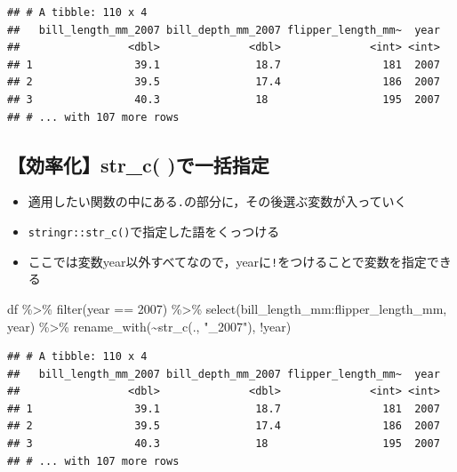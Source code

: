 \documentclass[
  xelatex,ja=standard, b5paper]{bxjsbook}
\newenvironment{Shaded}{\begin{snugshade}}{\end{snugshade}}
\newcommand{\DecValTok}[1]{\textcolor[rgb]{0.00,0.00,0.81}{#1}}
\newcommand{\FunctionTok}[1]{\textcolor[rgb]{0.00,0.00,0.00}{#1}}
\newcommand{\NormalTok}[1]{#1}
\newcommand{\SpecialCharTok}[1]{\textcolor[rgb]{0.00,0.00,0.00}{#1}}
\newcommand{\StringTok}[1]{\textcolor[rgb]{0.31,0.60,0.02}{#1}}
\providecommand{\tightlist}{%
  \setlength{\itemsep}{0pt}\setlength{\parskip}{0pt}}
\begin{document}
\begin{verbatim}
## # A tibble: 110 x 4
##   bill_length_mm_2007 bill_depth_mm_2007 flipper_length_mm~  year
##                 <dbl>              <dbl>              <int> <int>
## 1                39.1               18.7                181  2007
## 2                39.5               17.4                186  2007
## 3                40.3               18                  195  2007
## # ... with 107 more rows
\end{verbatim}

\hypertarget{rename-strc}{%
\subsection{【効率化】str\_c( )で一括指定}\label{rename-strc}}

\begin{itemize}
\tightlist
\item
  適用したい関数の中にある\texttt{.}の部分に，その後選ぶ変数が入っていく
\item
  \texttt{stringr::str\_c()}で指定した語をくっつける
\item
  ここでは変数year以外すべてなので，yearに\texttt{!}をつけることで変数を指定できる
\end{itemize}

\begin{Shaded}
\begin{Highlighting}[]
\NormalTok{df }\SpecialCharTok{\%\textgreater{}\%} 
  \FunctionTok{filter}\NormalTok{(year }\SpecialCharTok{==} \DecValTok{2007}\NormalTok{) }\SpecialCharTok{\%\textgreater{}\%} 
  \FunctionTok{select}\NormalTok{(bill\_length\_mm}\SpecialCharTok{:}\NormalTok{flipper\_length\_mm, year) }\SpecialCharTok{\%\textgreater{}\%} 
  \FunctionTok{rename\_with}\NormalTok{(}\SpecialCharTok{\textasciitilde{}}\FunctionTok{str\_c}\NormalTok{(., }\StringTok{"\_2007"}\NormalTok{),}
               \SpecialCharTok{!}\NormalTok{year)}
\end{Highlighting}
\end{Shaded}

\begin{verbatim}
## # A tibble: 110 x 4
##   bill_length_mm_2007 bill_depth_mm_2007 flipper_length_mm~  year
##                 <dbl>              <dbl>              <int> <int>
## 1                39.1               18.7                181  2007
## 2                39.5               17.4                186  2007
## 3                40.3               18                  195  2007
## # ... with 107 more rows
\end{verbatim}
\end{document}

